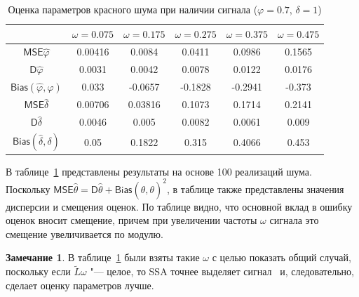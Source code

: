 \documentclass[specialist,
substylefile = spbu_report.rtx,
subf,href,colorlinks=true, 12pt]{disser}
\theoremstyle{definition}
\newtheorem{remark}{Замечание}
\begin{document}
\begin{table}[h]
	\centering
	\begin{tabular}{|cccccc|}
		\hline
		& $\omega = 0.075$ & $\omega=0.175$ & $\omega=0.275$ & $\omega=0.375$ & $\omega=0.475$ \\
		\hline
		$\mathsf{MSE}\hat\varphi$ & 0.00416 & 0.0084 & 0.0411 & 0.0986 & 0.1565 \\
		\hline
		$\mathsf{D}\hat\varphi$ & 0.0031 & 0.0042 & 0.0078 & 0.0122 & 0.0176 \\
		\hline
		$\mathsf{Bias}(\hat\varphi,\varphi)$ & 0.033 & -0.0657 & -0.1828 & -0.2941 & -0.373 \\
		\hhline{======}
		$\mathsf{MSE}\hat\delta$ & 0.00706 & 0.03816 & 0.1073 & 0.1714 & 0.2141 \\ 
		\hline
		$\mathsf{D}\hat\delta$ & 0.0046 & 0.005 & 0.0082 & 0.0061 & 0.009\\
		\hline
		$\mathsf{Bias}(\hat\delta, \delta)$ & 0.05 & 0.1822 & 0.315 & 0.4066 & 0.453\\
		\hline

	\end{tabular}
	\caption{Оценка параметров красного шума при наличии сигнала ($\varphi=0.7$, $\delta=1$)}
	\label{tab:param_estim}
\end{table}

В таблице~\ref{tab:param_estim} представлены результаты на основе 100 реализаций шума. Поскольку $\mathsf{MSE}\hat\theta=\mathsf{D}\hat \theta + \mathsf{Bias}(\hat\theta,\theta)^2$, в таблице также представлены значения дисперсии и смещения оценок. По таблице видно, что основной вклад в ошибку оценок вносит смещение, причем при увеличении частоты $\omega$ сигнала это смещение увеличивается по модулю.
\begin{remark}
	В таблице~\ref{tab:param_estim} были взяты такие $\omega$ с целью показать общий случай, поскольку если $\widetilde L\omega$ "--- целое, то SSA точнее выделяет сигнал~\cite{ssa_an} и, следовательно, сделает оценку параметров лучше.
\end{remark}
\end{document}
